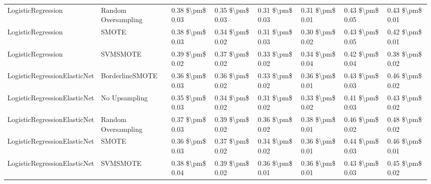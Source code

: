 \begin{tabular}{llllllll}
             LogisticRegression &           Random Oversampling & 0.38 \$\textbackslash pm\$ 0.03 &           0.35 \$\textbackslash pm\$ 0.03 &       0.31 \$\textbackslash pm\$ 0.03 &        0.31 \$\textbackslash pm\$ 0.01 &                         0.43 \$\textbackslash pm\$ 0.05 & 0.43 \$\textbackslash pm\$ 0.01 \\
             LogisticRegression &                         SMOTE & 0.38 \$\textbackslash pm\$ 0.03 &           0.34 \$\textbackslash pm\$ 0.02 &       0.31 \$\textbackslash pm\$ 0.03 &        0.30 \$\textbackslash pm\$ 0.02 &                         0.43 \$\textbackslash pm\$ 0.05 & 0.42 \$\textbackslash pm\$ 0.01 \\
             LogisticRegression &                      SVMSMOTE & 0.39 \$\textbackslash pm\$ 0.02 &           0.37 \$\textbackslash pm\$ 0.02 &       0.33 \$\textbackslash pm\$ 0.02 &        0.34 \$\textbackslash pm\$ 0.04 &                         0.42 \$\textbackslash pm\$ 0.04 & 0.38 \$\textbackslash pm\$ 0.02 \\
   LogisticRegressionElasticNet &               BorderlineSMOTE & 0.36 \$\textbackslash pm\$ 0.03 &           0.36 \$\textbackslash pm\$ 0.02 &       0.33 \$\textbackslash pm\$ 0.02 &        0.36 \$\textbackslash pm\$ 0.01 &                         0.43 \$\textbackslash pm\$ 0.03 & 0.46 \$\textbackslash pm\$ 0.02 \\
   LogisticRegressionElasticNet &                 No Upsampling & 0.35 \$\textbackslash pm\$ 0.03 &           0.34 \$\textbackslash pm\$ 0.02 &       0.31 \$\textbackslash pm\$ 0.02 &        0.33 \$\textbackslash pm\$ 0.02 &                         0.41 \$\textbackslash pm\$ 0.03 & 0.43 \$\textbackslash pm\$ 0.02 \\
   LogisticRegressionElasticNet &           Random Oversampling & 0.37 \$\textbackslash pm\$ 0.03 &           0.39 \$\textbackslash pm\$ 0.02 &       0.36 \$\textbackslash pm\$ 0.02 &        0.38 \$\textbackslash pm\$ 0.01 &                         0.46 \$\textbackslash pm\$ 0.02 & 0.48 \$\textbackslash pm\$ 0.02 \\
   LogisticRegressionElasticNet &                         SMOTE & 0.36 \$\textbackslash pm\$ 0.03 &           0.37 \$\textbackslash pm\$ 0.02 &       0.34 \$\textbackslash pm\$ 0.02 &        0.36 \$\textbackslash pm\$ 0.01 &                         0.44 \$\textbackslash pm\$ 0.03 & 0.46 \$\textbackslash pm\$ 0.01 \\
   LogisticRegressionElasticNet &                      SVMSMOTE & 0.38 \$\textbackslash pm\$ 0.04 &           0.39 \$\textbackslash pm\$ 0.02 &       0.36 \$\textbackslash pm\$ 0.01 &        0.36 \$\textbackslash pm\$ 0.01 &                         0.43 \$\textbackslash pm\$ 0.03 & 0.45 \$\textbackslash pm\$ 0.02 \\

\end{tabular}
